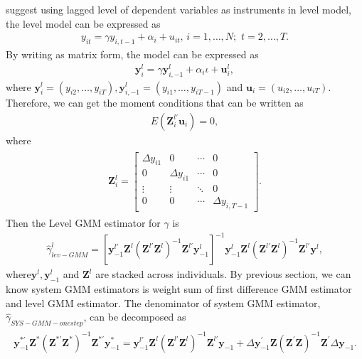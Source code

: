 \documentclass[12pt,a4paper,hyperref]{article}
\begin{document}
\citet{Arellano:1995} suggest using lagged level of dependent variables as instruments in level model, the level model can be expressed as
\begin{align}
y_{it}=\gamma y_{i,t-1}+\alpha_{i}+u_{it}, \, i=1,\ldots, N;\,\,t=2,\ldots, T.
\end{align}
By writing as matrix form, the model can be expressed as
\begin{align}
\boldsymbol{y}^{l}_{i}=\gamma \boldsymbol{y}^{l}_{i,-1}+\alpha_{i}\iota+\boldsymbol{u}^{l}_{i},
\end{align}
where $\boldsymbol{y}^{l}_{i}=\left(y_{i2},\ldots, y_{iT} \right), \boldsymbol{y}^{l}_{i,-1}=\left(y_{i1},\ldots, y_{iT-1} \right)$ and $\boldsymbol{u}_{i}=\left(u_{i2},\ldots, u_{iT} \right)$. Therefore, we can get the moment conditions that can be written as
\begin{align}
E \left( \boldsymbol{Z}^{l'}_{i}  \boldsymbol{u}_{i} \right)=0,
\end{align}
where
\begin{align}
\begin{split}
\boldsymbol{Z}^{l}_{i}=
\begin{bmatrix}
\Delta y_{i1} & 0 & \cdots & 0 \\
0             & \Delta y_{i1} &\cdots & 0 \\
\vdots &\vdots &\ddots & 0 \\
0 & 0 &\cdots & \Delta y_{i, T-1}
\end{bmatrix}.
\end{split}
\end{align}
Then the Level GMM estimator for $\gamma$ is
\begin{align}
\hat{\gamma}^{l}_{lev-GMM}=\left[\boldsymbol{y}^{l'}_{-1} \boldsymbol{Z}^{l}\left(\boldsymbol{Z}^{l'}\boldsymbol{Z}^{l}  \right)^{-1}\boldsymbol{Z}^{l'}\boldsymbol{y}^{l}_{-1} \right]^{-1}\boldsymbol{y}^{l}_{-1}\boldsymbol{Z}^{l}\left(\boldsymbol{Z}^{l'}\boldsymbol{Z}^{l}   \right)^{-1}\boldsymbol{Z}^{l'}\boldsymbol{y}^{l},
\end{align}
where$\boldsymbol{y}^{l}, \boldsymbol{y}^{l}_{-1}$ and $\boldsymbol{Z}^{l}$ are stacked across individuals.
By previous section, we can know system GMM estimators is weight sum of first difference GMM estimator and level GMM estimator. The denominator of system GMM estimator, $\hat{\gamma}_{SYS-GMM-onestep}$, can be decomposed as
\begin{align}
\begin{split}
  \boldsymbol{y}_{-1}^{\ast '} \boldsymbol{Z}^{\ast} \left(\boldsymbol{Z}^{\ast'}\boldsymbol{Z}^{\ast}  \right)^{-1} \boldsymbol{Z}^{\ast'} \boldsymbol{y}^{\ast}_{-1}   =\boldsymbol{y}_{-1}^{l'}\boldsymbol{Z}^{l}\left( \boldsymbol{Z}^{l'}\boldsymbol{Z}^{l} \right)^{-1}\boldsymbol{Z}^{l'}\boldsymbol{y}_{-1}+\Delta \boldsymbol{y}_{-1}^{'}\boldsymbol{Z}\left( \boldsymbol{Z}^{'}\boldsymbol{Z} \right)^{-1}\boldsymbol{Z}^{'}\Delta \boldsymbol{y}_{-1}.
\end{split}
\end{align}
\end{document}
